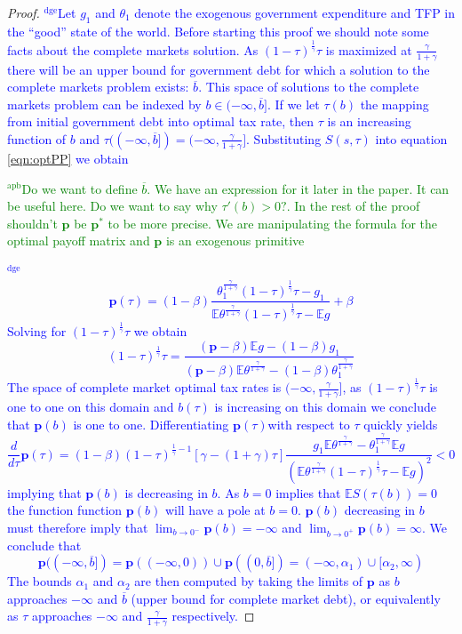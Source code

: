 \documentclass[12pt]{article}
\newcommand{\dge}[1]{\textcolor{blue}{$^{\textrm{dge}}${#1}}}
\newcommand{\apb}[1]{\textcolor{green}{$^{\textrm{apb}}${#1}}}
\newcommand{\EE}{\mathbb E}
\begin{document}
\begin{proof}  \dge{Let $g_1$ and $\theta_1$ denote the exogenous government expenditure and TFP in the ``good'' state of the world.  Before starting this proof we should note some facts about the complete markets solution.  As $(1-\tau)^\frac1\gamma\tau$ is maximized at $\frac\gamma{1+\gamma}$ there will be an upper bound for government debt for which a solution to the complete markets problem exists: $\overline b$.  This space of solutions to the complete markets problem can be indexed by $b\in(-\infty,\overline b]$.  If we let $\tau(b)$ the mapping from initial government debt into optimal tax rate, then $\tau$ is an increasing function of $b$ and $\tau((-\infty,\overline b]) = (-\infty,\frac{\gamma}{1+\gamma}]$.    Substituting $S(s,\tau)$ into equation \eqref{eqn:optPP} we obtain}

\apb{Do we want to define $\overline{b}$. We have an expression for it later in the paper. It can be useful here. Do we want to say why $\tau'(b)>0 ?$. In the rest of the proof shouldn't $\bm{p}$ be $\bm{p}^*$ to be more precise. We are manipulating the formula for the optimal payoff matrix and $\bm{p}$ is an exogenous primitive}

\dge{
\[
	\bm p(\tau) = (1-\beta)\frac{\theta_1^\frac\gamma{1+\gamma}(1-\tau)^\frac1\gamma\tau-g_1}{\EE\theta^\frac\gamma{1+\gamma}(1-\tau)^\frac1\gamma\tau - \EE g} + \beta
\]  Solving for $(1-\tau)^\frac1\gamma\tau$ we obtain
\[
	(1-\tau)^\frac{1}{\gamma}\tau = \frac{(\bm p-\beta)\EE g-(1-\beta)g_1}{(\bm p - \beta)\EE\theta^\frac{\gamma}{1+\gamma}-(1-\beta)\theta_1^\frac{\gamma}{1+\gamma}}
\]  The space of complete market optimal tax rates is $(-\infty,\frac\gamma{1+\gamma}]$, as $(1-\tau)^\frac1\gamma\tau$ is one to one on this domain and $b(\tau)$ is increasing on this domain we conclude that $\bm p(b)$ is one to one. Differentiating $\bm p(\tau)$with respect to $\tau$ quickly yields
\[ 
	\frac{d}{d\tau} \bm p(\tau) = (1-\beta)(1-\tau)^{\frac1\gamma-1}\left[\gamma-(1+\gamma)\tau\right]\frac{g_1\EE\theta^\frac{\gamma}{1+\gamma}-\theta_1^\frac\gamma{1+\gamma}\EE g }{(\EE\theta^\frac\gamma{1+\gamma}(1-\tau)^\frac1\gamma\tau-\EE g)^2} <0
\] implying that $\bm p(b)$ is decreasing in $b$.  As $b =0$ implies that $\EE S(\tau(b)) =0$ the function function $\bm p(b)$ will have a pole at $b = 0$.  $\bm p(b)$ decreasing in $b$ must therefore imply that $\lim_{b\rightarrow0^{-} } \bm p(b) = -\infty$ and $\lim_{b\rightarrow 0^+} \bm p(b) = \infty$.  We conclude that 
\[
	\bm p((-\infty,\overline b]) = \bm p((-\infty,0))\cup \bm p((0,\overline b]) = (-\infty,\alpha_1)\cup[\alpha_2,\infty)
\]The bounds $\alpha_1$ and $\alpha_2$ are then computed by taking the limits of $\bm p$ as $b$ approaches $-\infty$ and $\overline b$ (upper bound for complete market debt), or equivalently as $\tau$ approaches $-\infty$ and $\frac\gamma{1+\gamma}$ respectively.}
\end{proof}
\end{document}
